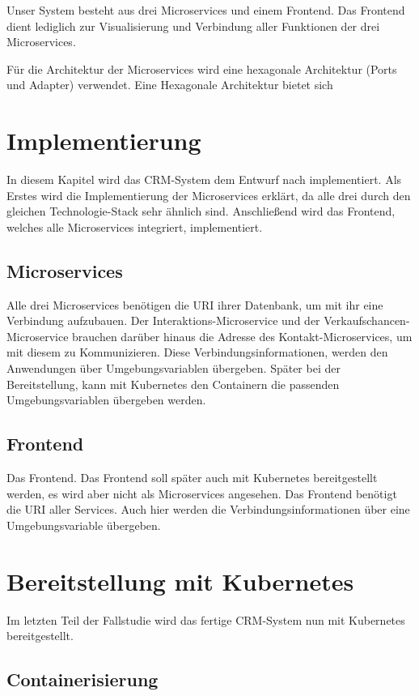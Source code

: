 Unser System besteht aus drei Microservices und einem Frontend. Das Frontend dient lediglich zur Visualisierung und Verbindung aller Funktionen der drei Microservices. 

Für die Architektur der Microservices wird eine hexagonale Architektur (Ports und Adapter) verwendet. Eine Hexagonale Architektur bietet sich 


\section{Implementierung}

In diesem Kapitel wird das CRM-System dem Entwurf nach implementiert. Als Erstes wird die Implementierung der Microservices erklärt, da alle drei durch den gleichen Technologie-Stack sehr ähnlich sind. Anschließend wird das Frontend, welches alle Microservices integriert, implementiert.

\subsection{Microservices}

Alle drei Microservices benötigen die \ac{URI} ihrer Datenbank, um mit ihr eine Verbindung aufzubauen. Der Interaktions-Microservice und der Verkaufschancen-Microservice brauchen darüber hinaus die Adresse des Kontakt-Microservices, um mit diesem zu Kommunizieren. Diese Verbindungsinformationen, werden den Anwendungen über Umgebungsvariablen übergeben. Später bei der Bereitstellung, kann mit Kubernetes den Containern die passenden Umgebungsvariablen übergeben werden.

\subsection{Frontend}

Das Frontend. Das Frontend soll später auch mit Kubernetes bereitgestellt werden, es wird aber nicht als Microservices angesehen. Das Frontend benötigt die \ac{URI} aller Services. Auch hier werden die Verbindungsinformationen über eine Umgebungsvariable übergeben.

\section{Bereitstellung mit Kubernetes}

Im letzten Teil der Fallstudie wird das fertige CRM-System nun mit Kubernetes bereitgestellt.

\subsection{Containerisierung}


